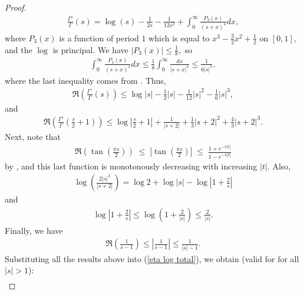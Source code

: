 \documentclass{amsart}
\theoremstyle{plain}
\theoremstyle{definition}
\begin{document}
\begin{proof}
\begin{align*}
        \frac{\Gamma'}{\Gamma}(s)= \log(s) -\frac{1}{2s}-\frac{1}{12s^2}+\int_0^{\infty}\frac{P_3(x)}{(s+x)^4}dx,
    \end{align*}
    where $P_3(x)$ is a function of period $1$ which is equal to 
    \(x^3-\frac{3}{2}x^2+\frac{1}{2}\) on $[0,1]$, and the $\log$ is principal. 
    We have $|P_3(x)|\leq \frac{1}{8},$ so
    \begin{align*}
        \int_0^{\infty}\frac{P_3(x)}{(s+x)^4}dx\leq \frac{1}{8}\int_0^{\infty}\frac{dx}{|s+x|^4}\leq \frac{1}{6|s|^3},
    \end{align*}
where the last inequality comes from \cite[(6)]{spira3}. Thus, 
    \begin{align*}%
        \Re\left(\frac{\Gamma'}{\Gamma}(s)\right)\leq \log|s|-\frac{1}{2}|s|-\frac{1}{12}|s|^2-\frac{1}{6}|s|^3,
    \end{align*}
    and
    \begin{align*}%
        \Re\left(\frac{\Gamma'}{\Gamma}\left(\frac{s}{2}+1\right)\right)\leq \log|\frac{s}{2}+1|+\frac{1}{|s+2|}+\frac{1}{3}|s+2|^2+\frac{4}{3}|s+2|^3.
    \end{align*}
    Next, note that 
    \begin{align*}%
        \Re\left(\tan\left(\frac{\pi s}{2}\right)\right) \; \leq \; \left|\tan\left(\frac{\pi s}{2}\right) \right| \; \leq \; \frac{1+e^{-\pi|t|}}{1-e^{-\pi|t|}}
    \end{align*}
    by \cite[(14)]{spira3}, and this last function is monotonously decreasing with increasing $|t|$. Also,
    \begin{align*}%
        \log\left(\frac{2|s|^2}{|s+2|}\right)=\log 2+\log|s|-\log \left|1+\frac{2}{s} \right|
    \end{align*}
    and
    \begin{align*}%
        \log\left|1+\frac{2}{s}\right|\leq \log\left(1+\frac{2}{|s|}\right)\leq \frac{2}{|s|}.
    \end{align*}
    Finally, we have 
    \begin{align}%
        \Re\left(\frac{1}{s-1}\right)\leq \left|\frac{1}{s-1}\right|\leq \frac{1}{|s|-1}.
    \end{align}
    Substituting all the results above %
    into (\ref{eta log total}), we obtain (valid for for all $|s|>1$): 
    \begin{align}\label{eta' total}

\end{align}
\end{proof}
\end{document}
